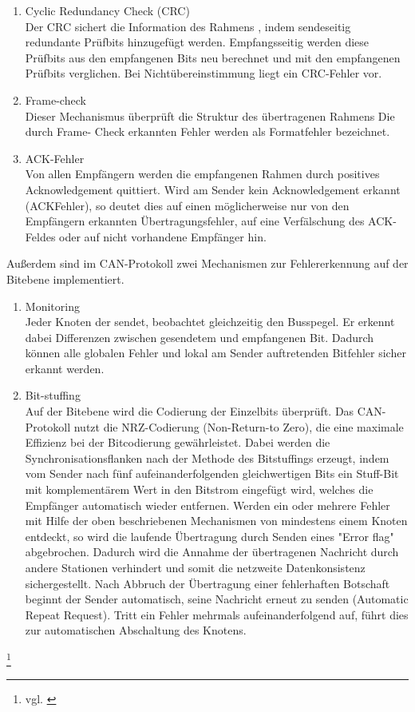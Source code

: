 \begin{enumerate}
	\item Cyclic Redundancy Check (CRC)\\
	Der CRC sichert die Information des Rahmens , indem sendeseitig redundante Prüfbits
	hinzugefügt werden. Empfangsseitig werden diese Prüfbits aus den empfangenen Bits
	neu berechnet und mit den empfangenen Prüfbits verglichen. Bei Nichtübereinstimmung
	liegt ein CRC-Fehler vor.
	\item Frame-check\\
	Dieser Mechanismus überprüft die Struktur des übertragenen Rahmens Die durch Frame-
	Check erkannten Fehler werden als Formatfehler bezeichnet.
	\item ACK-Fehler\\
	Von allen Empfängern werden die empfangenen Rahmen durch positives
	Acknowledgement quittiert. Wird am Sender kein Acknowledgement erkannt (ACKFehler),
	so deutet dies auf einen möglicherweise nur von den Empfängern erkannten
	Übertragungsfehler, auf eine Verfälschung des ACK-Feldes oder auf nicht vorhandene
	Empfänger hin.
\end{enumerate}

Außerdem sind im CAN-Protokoll zwei Mechanismen zur Fehlererkennung auf der
Bitebene implementiert.

\begin{enumerate}
	\item Monitoring\\
	Jeder Knoten der sendet, beobachtet gleichzeitig den Busspegel. Er erkennt dabei
	Differenzen zwischen gesendetem und empfangenen Bit. Dadurch können alle globalen
	Fehler und lokal am Sender auftretenden Bitfehler sicher erkannt werden.
	\item Bit-stuffing\\
	Auf der Bitebene wird die Codierung der Einzelbits überprüft. Das CAN-Protokoll nutzt die
	NRZ-Codierung (Non-Return-to Zero), die eine maximale Effizienz bei der Bitcodierung
	gewährleistet. Dabei werden die Synchronisationsflanken nach der Methode des Bitstuffings
	erzeugt, indem vom Sender nach fünf aufeinanderfolgenden gleichwertigen Bits
	ein Stuff-Bit mit komplementärem Wert in den Bitstrom eingefügt wird, welches die
	Empfänger automatisch wieder entfernen. Werden ein oder mehrere Fehler mit Hilfe der
	oben beschriebenen Mechanismen von mindestens einem Knoten entdeckt, so wird die
	laufende Übertragung durch Senden eines "Error flag" abgebrochen. Dadurch wird die
	Annahme der übertragenen Nachricht durch andere Stationen verhindert und somit die
	netzweite Datenkonsistenz sichergestellt. Nach Abbruch der Übertragung einer
	fehlerhaften Botschaft beginnt der Sender automatisch, seine Nachricht erneut zu senden
	(Automatic Repeat Request).
	Tritt ein Fehler mehrmals aufeinanderfolgend auf, führt dies zur automatischen
	Abschaltung des Knotens.
\end{enumerate}
\footnote{vgl. \cite{CAN}}

